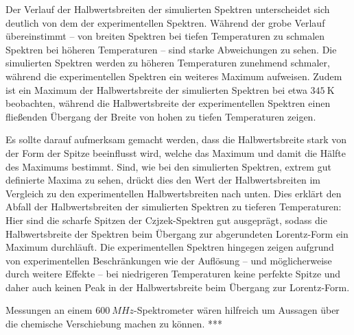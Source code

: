 Der Verlauf der Halbwertsbreiten der simulierten Spektren unterscheidet sich deutlich von dem der experimentellen Spektren. Während der grobe Verlauf übereinstimmt -- von breiten Spektren bei tiefen Temperaturen zu schmalen Spektren bei höheren Temperaturen -- sind starke Abweichungen zu sehen. Die simulierten Spektren werden zu höheren Temperaturen zunehmend schmaler, während die experimentellen Spektren ein weiteres Maximum aufweisen. Zudem ist ein Maximum der Halbwertsbreite der simulierten Spektren bei etwa $\SI{345}{\kelvin}$ beobachten, während die Halbwertsbreite der experimentellen Spektren einen fließenden Übergang der Breite von hohen zu tiefen Temperaturen zeigen.

Es sollte darauf aufmerksam gemacht werden, dass die Halbwertsbreite stark von der Form der Spitze beeinflusst wird, welche das Maximum und damit die Hälfte des Maximums bestimmt. Sind, wie bei den simulierten Spektren, extrem gut definierte Maxima zu sehen, drückt dies den Wert der Halbwertsbreiten im Vergleich zu den experimentellen Halbwertsbreiten nach unten. Dies erklärt den Abfall der Halbwertsbreiten der simulierten Spektren zu tieferen Temperaturen: Hier sind die scharfe Spitzen der Czjzek-Spektren gut ausgeprägt, sodass die Halbwertsbreite der Spektren beim Übergang zur abgerundeten Lorentz-Form ein Maximum durchläuft. Die experimentellen Spektren hingegen zeigen aufgrund von experimentellen Beschränkungen wie der Auflösung -- und möglicherweise durch weitere Effekte -- bei niedrigeren Temperaturen keine perfekte Spitze und daher auch keinen Peak in der Halbwertsbreite beim Übergang zur Lorentz-Form.


Messungen an einem $\SI{600}{MHz}$-Spektrometer wären hilfreich um Aussagen über die chemische Verschiebung machen zu können. *** 



